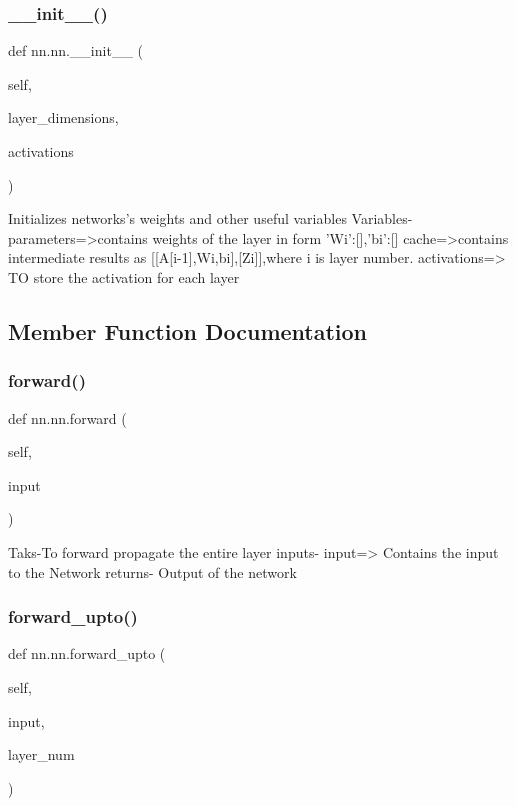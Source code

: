 \subsubsection{\texorpdfstring{\+\_\+\+\_\+init\+\_\+\+\_\+()}{\_\_init\_\_()}}
{\footnotesize\ttfamily def nn.\+nn.\+\_\+\+\_\+init\+\_\+\+\_\+ (\begin{DoxyParamCaption}\item[{}]{self,  }\item[{}]{layer\+\_\+dimensions,  }\item[{}]{activations }\end{DoxyParamCaption})}

\begin{DoxyVerb}Initializes networks's weights and other useful variables
Variables-parameters=>contains weights of the layer in form {'Wi':[],'bi':[]}
  cache=>contains intermediate results as [[A[i-1],Wi,bi],[Zi]],where i
  is layer number.
  activations=> TO store the activation for each layer
\end{DoxyVerb}
 

\subsection{Member Function Documentation}
\mbox{\label{classnn_1_1nn_ace3e99e16bb7d1256d4d1fbf7e6cebd0}} 
\subsubsection{\texorpdfstring{forward()}{forward()}}
{\footnotesize\ttfamily def nn.\+nn.\+forward (\begin{DoxyParamCaption}\item[{}]{self,  }\item[{}]{input }\end{DoxyParamCaption})}

\begin{DoxyVerb}Taks-To forward propagate the entire layer
inputs- input=> Contains the input to the Network
returns- Output of the network
\end{DoxyVerb}
 \mbox{\label{classnn_1_1nn_afd6fb3877eeb0ddd889484caea7ca6e3}} 
\subsubsection{\texorpdfstring{forward\+\_\+upto()}{forward\_upto()}}
{\footnotesize\ttfamily def nn.\+nn.\+forward\+\_\+upto (\begin{DoxyParamCaption}\item[{}]{self,  }\item[{}]{input,  }\item[{}]{layer\+\_\+num }\end{DoxyParamCaption})}

